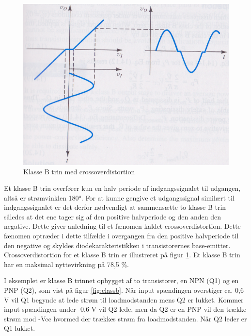 \begin{figure}[ht]
\begin{minipage}[b]{0.5\linewidth}
\includegraphics[scale=.25]{valg_af_loesning/klasser/klassebproblem.png}
\caption{Klasse B trin med crossoverdistortion}
\label{fig:classbproblem}
\end{minipage}
\end{figure}
Et klasse B trin overfører kun en halv periode af indgangssignalet til udgangen, altså er strømvinklen 180°. For at kunne gengive et udgangssignal similært til indgangssignalet er det derfor nødvendigt at sammensætte to klasse B trin således at det ene tager sig af den positive halvperiode og den anden den negative. Dette giver anledning til et fænomen kaldet crossoverdistortion. Dette fænomen optræder i dette tilfælde i overgangen fra den positive halvperiode til den negative og skyldes diodekarakteristikken i transistorernes base-emitter. Crossoverdistortion for et klasse B trin er illustreret på figur \ref{fig:classbproblem}.
Et klasse B trin har en maksimal nyttevirkning på 78,5 \%.

I eksemplet er klasse B trinnet opbygget af to transistorer, en NPN (Q1) og en PNP (Q2), som vist på figur \ref{fig:classb}. Når input spændingen overstiger ca. 0,6 V vil Q1 begynde at lede strøm til loadmodstanden mens Q2 er lukket. Kommer input spændingen under -0,6 V vil Q2 lede, men da Q2 er en PNP vil den trække strøm mod -Vcc hvormed der trækkes strøm fra loadmodstanden. Når Q2 leder er Q1 lukket. 

